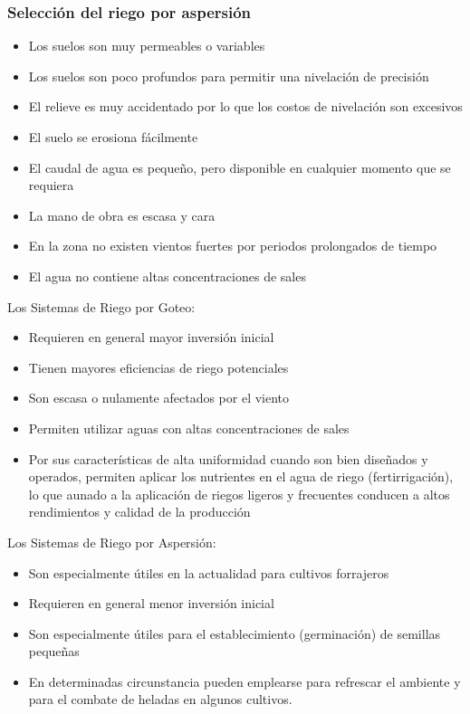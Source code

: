 \subsubsection{Selección del riego por aspersión}
\begin{itemize}
    \item Los suelos son muy permeables o variables
    \item Los suelos son poco profundos para permitir una nivelación de precisión
    \item El relieve es muy accidentado por lo que los costos de nivelación son excesivos
    \item El suelo se erosiona fácilmente
    \item El caudal de agua es pequeño, pero disponible en cualquier momento que se requiera
    \item La mano de obra es escasa y cara
    \item En la zona no existen vientos fuertes por periodos prolongados de tiempo
    \item El agua no contiene altas concentraciones de sales
\end{itemize}
Los Sistemas de Riego por Goteo:
\begin{itemize}
    \item Requieren en general mayor inversión inicial
    \item Tienen mayores eficiencias de riego potenciales
    \item Son escasa o nulamente afectados por el viento
    \item Permiten utilizar aguas con altas concentraciones de sales
    \item Por sus características de alta uniformidad cuando son bien diseñados y operados, permiten aplicar los nutrientes en el agua de riego (fertirrigación), lo que aunado a la aplicación de riegos ligeros y frecuentes conducen a altos rendimientos y calidad de la producción
\end{itemize}
Los Sistemas de Riego por Aspersión:
\begin{itemize}
    \item Son especialmente útiles en la actualidad para cultivos forrajeros
    \item Requieren en general menor inversión inicial
    \item Son especialmente útiles para el establecimiento (germinación) de semillas pequeñas
    \item En determinadas circunstancia pueden emplearse para refrescar el ambiente y para el combate de heladas en algunos cultivos.
\end{itemize}

